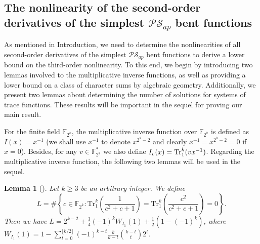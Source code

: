 \documentclass[preprint,10pt]{elsarticle}
\newcommand{\F}{\mathbb{F}}
\newcommand{\0}{\textbf{0}}
\newcommand{\1}{\textbf{1}}
\theoremstyle{plain}
\newtheorem{lemma}{Lemma}
\begin{document}
    \subsection{The nonlinearity of the second-order derivatives of the simplest $\mathcal{PS}_{ap}$ bent functions}
    As mentioned in Introduction,
    we need to determine the nonlinearities of all second-order derivatives of the simplest $\mathcal{PS}_{ap}$ bent functions to derive a lower bound on the third-order nonlinearity.
    To this end, we begin by introducing two lemmas involved to the multiplicative inverse functions,
    as well as providing a lower bound on a class of character sums by algebraic geometry.
    Additionally, we present two lemmas about determining the number of solutions for systems of trace functions.
    These results will be important in the sequel for proving our main result.

    For the finite field $\F_{2^k}$, the multiplicative inverse function over $\F_{2^k}$ is defined as $I(x)=x^{-1}$ (we shall use $x^{-1}$ to denote $x^{2^k-2}$ and clearly $x^{-1}=x^{2^k-2}=0$ if $x=0$).
    Besides, for any $v\in\F_{2^k}^*$ we also define $I_v(x)=\Tr_1^k(vx^{-1})$.
    Regarding the multiplicative inverse function, the following two lemmas will be used in the sequel.

    \begin{lemma}[\cite{TangMM2022inversefunction}]\label{L:SumInv00}
        Let $k\geq 3$ be an arbitrary integer.
        We define
        $$L=\#\left\{c\in\F_{2^k}  :  \mathrm{Tr}_1^k\left(\frac{1}{c^2+c+1}\right)=\mathrm{Tr}_1^k\left(\frac{c^2}{c^2+c+1}\right)=0\right\}.$$
        Then we have $L=2^{k-2}+\frac{3}{4}(-1)^kW_{I_1}(1)+\frac{1}{2}\left(1-(-1)^k\right)$, where $W_{I_1}(1)=1-\sum_{t=0}^{\lfloor k/2\rfloor}(-1)^{k-t}\frac{k}{k-t}{{k-t}\choose {t}}2^t$.
    \end{lemma}
\end{document}

